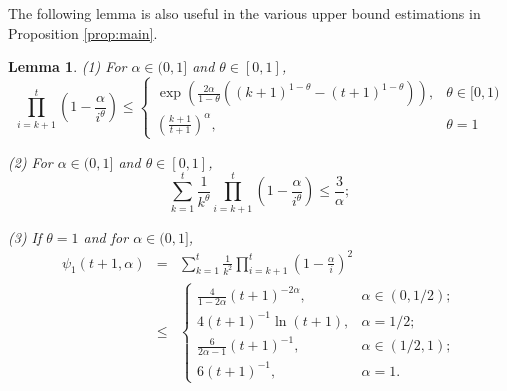 \documentclass[twoside]{amsart}
\theoremstyle{theorem}
\newtheorem{lem}[thm]{Lemma}
\theoremstyle{definition}
\theoremstyle{remark}
\newcommand{\DS}{\displaystyle}
\begin{document}
The following lemma is also useful in the various upper bound estimations in Proposition \ref{prop:main}.

\begin{lem}\label{lem:yyf}
(1) For $\alpha\in (0,1]$ and $\theta\in [0,1]$,
\[ \prod_{i=k+1}^t \left(1-\frac{\alpha}{i^\theta}\right) \leq
\left\{
\begin{array}{ll}
\DS \exp \left(\frac{2\alpha}{1-\theta} \left((k+1)^{1-\theta}-(t+1)^{1-\theta} \right)\right), & \theta\in [0,1) \\
\DS \left(\frac{k+1}{t+1}\right)^{\alpha}, & \theta = 1
\end{array}
\right.
\]


\noindent (2) For $\alpha\in (0,1]$ and $\theta\in [0,1]$,
\[ \sum_{k=1}^{t} \frac{1}{k^\theta} \prod_{i=k+1}^t \left(1-\frac{\alpha}{i^\theta}\right) \leq \frac{3}{\alpha}; \]

\noindent (3)
If $\theta=1$ and for $\alpha\in (0,1]$,
\begin{eqnarray*}
\psi_1(t+1,\alpha) & = & \sum_{k=1}^{t} \frac{1}{k^{2}} \prod_{i=k+1}^t \left(1-\frac{\alpha}{i}\right)^2 \\
& \leq
&
\left\{
\begin{array}{ll}
\DS \frac{4}{1-2\alpha}(t+1)^{-2\alpha}, & \alpha\in(0,1/2); \\
\DS 4 (t+1)^{-1}\ln(t+1), &\alpha=1/2; \\
\DS \frac{6}{2\alpha-1} (t+1)^{-1}, & \alpha\in(1/2,1); \\
\DS 6 (t+1)^{-1}, & \alpha=1.

\end{array}
\right.
\end{eqnarray*}
\end{lem}
\end{document}
